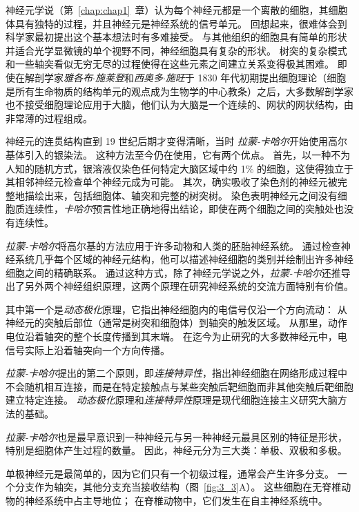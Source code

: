 神经元学说（第~\ref{chap:chap1}~章）认为每个神经元都是一个离散的细胞，其细胞体具有独特的过程，并且神经元是神经系统的信号单元。
回想起来，很难体会到科学家最初提出这个基本想法时有多难接受。
与其他组织的细胞具有简单的形状并适合光学显微镜的单个视野不同，神经细胞具有复杂的形状。
树突的复杂模式和一些轴突看似无穷无尽的过程使得在这些元素之间建立关系变得极其困难。
即使在解剖学家\textit{雅各布$\cdot$施莱登}和\textit{西奥多$\cdot$施旺}于 1830 年代初期提出细胞理论（细胞是所有生命物质的结构单元的观点成为生物学的中心教条）之后，大多数解剖学家也不接受细胞理论应用于大脑，他们认为大脑是一个连续的、网状的网状结构，由非常薄的过程组成。


神经元的连贯结构直到 19 世纪后期才变得清晰，当时 \textit{拉蒙-卡哈尔}开始使用高尔基体引入的银染法。
这种方法至今仍在使用，它有两个优点。
首先，以一种不为人知的随机方式，银溶液仅染色任何特定大脑区域中约 1\% 的细胞，这使得独立于其相邻神经元检查单个神经元成为可能。
其次，确实吸收了染色剂的神经元被完整地描绘出来，包括细胞体、轴突和完整的树突树。
染色表明神经元之间没有细胞质连续性，\textit{卡哈尔}预言性地正确地得出结论，即使在两个细胞之间的突触处也没有连续性。


\textit{拉蒙-卡哈尔}将高尔基的方法应用于许多动物和人类的胚胎神经系统。 
通过检查神经系统几乎每个区域的神经元结构，他可以描述神经细胞的类别并绘制出许多神经细胞之间的精确联系。
通过这种方式，除了神经元学说之外，\textit{拉蒙-卡哈尔}还推导出了另外两个神经组织原理，这两个原理在研究神经系统的交流方面特别有价值。


其中第一个是\textit{动态极化}原理，它指出神经细胞内的电信号仅沿一个方向流动：
从神经元的突触后部位（通常是树突和细胞体）到轴突的触发区域。
从那里，动作电位沿着轴突的整个长度传播到其末端。
在迄今为止研究的大多数神经元中，电信号实际上沿着轴突向一个方向传播。


\textit{拉蒙-卡哈尔}提出的第二个原则，即\textit{连接特异性}，指出神经细胞在网络形成过程中不会随机相互连接，而是在特定接触点与某些突触后靶细胞而非其他突触后靶细胞建立特定连接。
\textit{动态极化}原理和\textit{连接特异性}原理是现代细胞连接主义研究大脑方法的基础。


\textit{拉蒙-卡哈尔}也是最早意识到一种神经元与另一种神经元最具区别的特征是形状，特别是细胞体产生过程的数量。 
因此，神经元分为三大类：单极、双极和多极。


单极神经元是最简单的，因为它们只有一个初级过程，通常会产生许多分支。
一个分支作为轴突，其他分支充当接收结构（图~\ref{fig:3_3}A）。
这些细胞在无脊椎动物的神经系统中占主导地位；
在脊椎动物中，它们发生在自主神经系统中。


